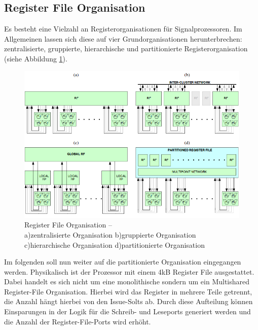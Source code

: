 \subsection{Register File Organisation}
Es besteht eine Vielzahl an Registerorganisationen für Signalprozessoren. Im Allgemeinen lassen sich diese auf vier Grundorganisationen herunterbrechen: zentralisierte, gruppierte, hierarchische und partitionierte Registerorganisation (siehe Abbildung \ref{fig:RegisterOrga}).\newline
\begin{figure}[htbp] 
	\centering
	\includegraphics[width=\textwidth]{fig/Register_orga.png}
	\caption[Register File Organisation]{Register File Organisation –\\ a)zentralisierte Organisation b)gruppierte Organisation c)hierarchische Organisation d)partitionierte Organisation  \cite{paya2010multi}}
	\label{fig:RegisterOrga}
\end{figure}
\newline
Im folgenden soll nun weiter auf die partitionierte Organisation eingegangen werden. Physikalisch ist der Prozessor mit einem 4kB Register File ausgestattet. Dabei handelt es sich nicht um eine monolithische sondern um ein Multishared Register-File Organisation. Hierbei wird das Register in mehrere Teile getrennt, die Anzahl hängt hierbei von den Issue-Solts ab. Durch diese Aufteilung können Einsparungen in der Logik für die Schreib- und Leseports generiert werden und die Anzahl der Register-File-Ports wird erhöht.

